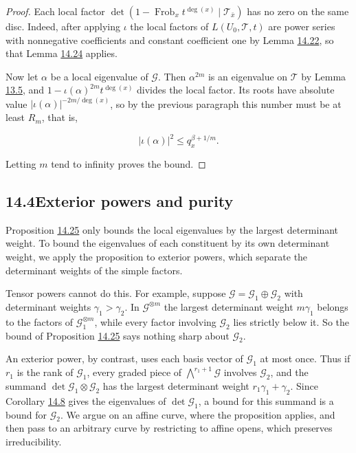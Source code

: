\documentclass[11pt]{article}
\begin{document}
\begin{proof}[{Proof}]
Each local factor \(\det(1-\operatorname{Frob}_x t^{\deg(x)}\mid\mathcal T_{\bar x})\) has no zero on the same disc. Indeed, after applying \(\iota\) the local factors of \(L(U_0,\mathcal T,t)\) are power series with nonnegative coefficients and constant coefficient one by Lemma \hyperref[bp109]{14.22}, so that Lemma \hyperref[bp113]{14.24} applies.

Now let \(\alpha\) be a local eigenvalue of \(\mathcal G\). Then \(\alpha^{2m}\) is an eigenvalue on \(\mathcal T\) by Lemma \hyperref[bp19]{13.5}, and \(1-\iota(\alpha)^{2m}t^{\deg(x)}\) divides the local factor. Its roots have absolute value \(|\iota(\alpha)|^{-2m/\deg(x)}\), so by the previous paragraph this number must be at least \(R_m\), that is,

\[
|\iota(\alpha)|^2\le q_x^{\beta+1/m}.
\]

Letting \(m\) tend to infinity proves the bound.
\end{proof}


\subsection*{\texorpdfstring{14.4\quad Exterior powers and purity}{14.4 Exterior powers and purity}}
\label{bp118}%
\label{bp119}%
Proposition \hyperref[bp116]{14.25} only bounds the local eigenvalues by the largest determinant weight. To bound the eigenvalues of each constituent by its own determinant weight, we apply the proposition to exterior powers, which separate the determinant weights of the simple factors.

Tensor powers cannot do this. For example, suppose \(\mathcal G=\mathcal G_1\oplus\mathcal G_2\) with determinant weights \(\gamma_1>\gamma_2\). In \(\mathcal G^{\otimes m}\) the largest determinant weight \(m\gamma_1\) belongs to the factors of \(\mathcal G_1^{\otimes m}\), while every factor involving \(\mathcal G_2\) lies strictly below it. So the bound of Proposition \hyperref[bp116]{14.25} says nothing sharp about \(\mathcal G_2\).

An exterior power, by contrast, uses each basis vector of \(\mathcal G_1\) at most once. Thus if \(r_1\) is the rank of \(\mathcal G_1\), every graded piece of \(\bigwedge^{r_1+1}\mathcal G\) involves \(\mathcal G_2\), and the summand \(\det\mathcal G_1\otimes\mathcal G_2\) has the largest determinant weight \(r_1\gamma_1+\gamma_2\). Since Corollary \hyperref[bp65]{14.8} gives the eigenvalues of \(\det\mathcal G_1\), a bound for this summand is a bound for \(\mathcal G_2\). We argue on an affine curve, where the proposition applies, and then pass to an arbitrary curve by restricting to affine opens, which preserves irreducibility.
\end{document}
